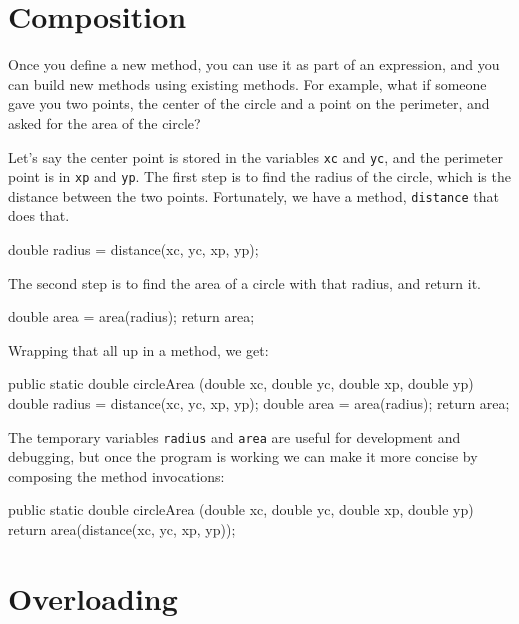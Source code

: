 \documentclass[12pt]{book}
\begin{document}
\section{Composition}

Once you define a new method, you can use it as part of an expression, and you can build new methods using existing methods.
For example, what if someone gave you two points, the center of the circle and a point on the perimeter, and asked for the area of the circle?

Let's say the center point is stored in the variables {\tt xc} and {\tt yc}, and the perimeter point is in {\tt xp} and {\tt yp}.
The first step is to find the radius of the circle, which is the distance between the two points.
Fortunately, we have a method, {\tt distance} that does that.

\begin{code}
    double radius = distance(xc, yc, xp, yp);
\end{code}

The second step is to find the area of a circle with that radius, and return it.

\begin{code}
    double area = area(radius);
    return area;
\end{code}

Wrapping that all up in a method, we get:

\begin{code}
    public static double circleArea
            (double xc, double yc, double xp, double yp) {
        double radius = distance(xc, yc, xp, yp);
        double area = area(radius);
        return area;
    }
\end{code}

The temporary variables {\tt radius} and {\tt area} are useful for development and debugging, but once the program is working we can make it more concise by composing the method invocations:

\begin{code}
    public static double circleArea
            (double xc, double yc, double xp, double yp) {
        return area(distance(xc, yc, xp, yp));
    }
\end{code}


\section{Overloading}
\label{overloading}

\end{document}
